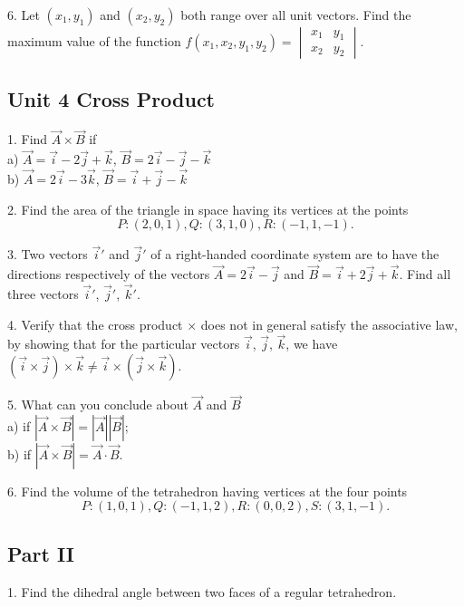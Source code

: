 \documentclass{article}
\begin{document}
6. Let $(x_{1}, y_{1})$ and $(x_{2}, y_{2})$ both range over all unit vectors.
Find the maximum value of the function $f(x_{1}, x_{2}, y_{1}, y_{2}) =
\begin{vmatrix}
x_{1} & y_{1} \\
x_{2} & y_{2}   
\end{vmatrix}$.

\subsection*{Unit 4 Cross Product}

1. Find $\vec{A} \times \vec{B}$ if\\
a) $\vec{A} = \vec{i} - 2 \vec{j} + \vec{k}$, $\vec{B} = 2 \vec{i} - \vec{j} -
\vec{k}$ \\
b) $\vec{A} = 2 \vec{i} - 3 \vec{k}$, $\vec{B} = \vec{i} + \vec{j} - \vec{k}$

2. Find the area of the triangle in space having its vertices at the points
\[ P:(2,0,1), Q:(3,1,0), R:(-1,1,-1).\]

3. Two vectors $\vec{i}'$ and $\vec{j}'$ of a right-handed coordinate system
are to have the directions respectively of the vectors $\vec{A} = 2 \vec{i} -
\vec{j}$ and $\vec{B} = \vec{i} + 2 \vec{j} + \vec{k}$. Find all three vectors
$\vec{i}'$, $\vec{j}'$, $\vec{k}'$.

4. Verify that the cross product $\times$ does not in general satisfy the
associative law, by showing that for the particular vectors $\vec{i}$,
$\vec{j}$, $\vec{k}$, we have $(\vec{i} \times \vec{j}) \times \vec{k} \neq
\vec{i} \times (\vec{j} \times \vec{k})$.

5. What can you conclude about $\vec{A}$ and $\vec{B}$\\
a) if $|\vec{A} \times \vec{B}| = |\vec{A}||\vec{B}|$;\\
b) if $|\vec{A} \times \vec{B}| = \vec{A} \cdot \vec{B}$.

6. Find the volume of the tetrahedron having vertices at the four points
\[ P:(1,0,1), Q:(-1,1,2), R:(0,0,2), S:(3,1,-1).\]

\begin{center}
\section*{Part II}
\end{center}

1. Find the dihedral angle between two faces of a regular tetrahedron.
\end{document}
